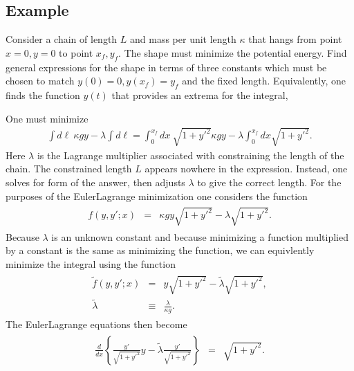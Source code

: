 \documentclass[letterpaper,10pt,english]{sphinxmanual}
\begin{document}
\subsection{Example}
\label{\detokenize{chapter1:example}}
Consider a chain of length \(L\) and mass per unit length \(\kappa\) that
hangs from point \(x=0,y=0\) to point \(x_f,y_f\). The shape must minimize
the potential energy. Find general expressions for the shape in terms
of three constants which must be chosen to match \(y(0)=0, y(x_f)=y_f\)
and the fixed length. Equivalently, one finds the function \(y(t)\) that
provides an extrema for the integral,

One must minimize
\begin{equation*}
\begin{split}
\int d\ell~\kappa gy-\lambda\int d\ell=
\int_0^{x_f} dx~\sqrt{1+y'^2}\kappa gy-\lambda \int_0^{x_f} dx\sqrt{1+y'^2}.
\end{split}
\end{equation*}
Here \(\lambda\) is the Lagrange multiplier associated with constraining
the length of the chain. The constrained length \(L\) appears nowhere in
the expression. Instead, one solves for form of the answer, then
adjusts \(\lambda\) to give the correct length. For the purposes of the
Euler\sphinxhyphen{}Lagrange minimization one considers the function
\begin{equation*}
\begin{split}
\begin{eqnarray}
f(y,y';x)&=&\kappa gy\sqrt{1+y'^2}-\lambda\sqrt{1+y'^2}.
\end{eqnarray}
\end{split}
\end{equation*}
Because \(\lambda\) is an unknown constant and because minimizing a
function multiplied by a constant is the same as minimizing the
function, we can equivlently minimize the integral using the function
\begin{equation*}
\begin{split}
\begin{eqnarray}
\tilde{f}(y,y';x)&=&y\sqrt{1+y'^2}-\tilde{\lambda}\sqrt{1+y'^2},\\
\nonumber
\tilde{\lambda}&\equiv&\frac{\lambda}{\kappa g}.
\end{eqnarray}
\end{split}
\end{equation*}
The Euler\sphinxhyphen{}Lagrange equations then become
\begin{equation*}
\begin{split}
\begin{eqnarray*}
\frac{d}{dx}\left\{
\frac{y'}{\sqrt{1+y'^2}}y-\tilde{\lambda}\frac{y'}{\sqrt{1+y'^2}}
\right\}&=&\sqrt{1+y'^2}.
\end{eqnarray*}
\end{split}
\end{equation*}
\end{document}
